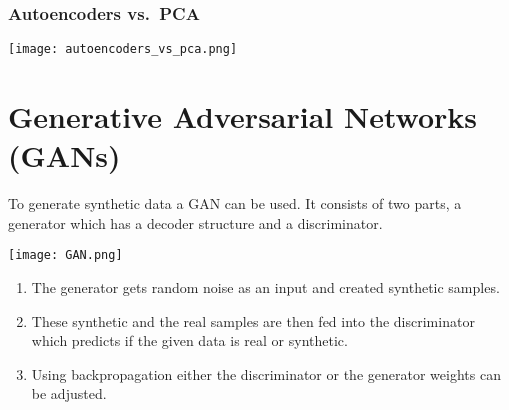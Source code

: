 \subsubsection{Autoencoders vs.\ PCA}
\begin{center}
    \texttt{[image: autoencoders\_vs\_pca.png]}
\end{center}

\section{Generative Adversarial Networks (GANs)}

To generate synthetic data a GAN can be used. It consists of two parts, a generator which has a decoder structure and a discriminator. 
\begin{center}
    \texttt{[image: GAN.png]}
\end{center}
\begin{enumerate}
    \item The generator gets random noise as an input and created synthetic samples.
    \item These synthetic and the real samples are then fed into the discriminator which predicts if the given data is real or synthetic.
    \item Using backpropagation either the discriminator or the generator weights can be adjusted.
\end{enumerate}
